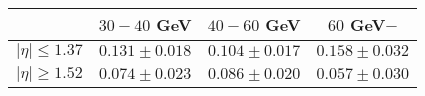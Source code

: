 \centering
\begin{tabular}{cccc} \toprule\toprule
& $30-40$ GeV & $40-60$ GeV & $60$ GeV$-$\\\midrule
$\lvert \eta \rvert \leq 1.37$ & $0.131\pm0.018$ & $0.104\pm0.017$ & $0.158\pm0.032$\\
$\lvert \eta \rvert \geq 1.52$ & $0.074\pm0.023$ & $0.086\pm0.020$ & $0.057\pm0.030$\\
\bottomrule\bottomrule
\end{tabular}

